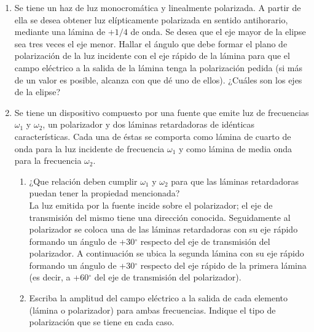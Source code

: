 \documentclass[11pt,spanish,a4paper]{article}
\begin{document}
\begin{enumerate}
\item Se tiene un haz de luz monocromática y linealmente polarizada. A partir
de ella se desea obtener luz elípticamente polarizada en sentido antihorario,
mediante una lámina de $+1/4$ de onda. Se desea que el eje mayor
de la elipse sea tres veces el eje menor. Hallar el ángulo que debe
formar el plano de polarización de la luz incidente con el eje rápido
de la lámina para que el campo eléctrico a la salida de la lámina
tenga la polarización pedida (si más de un valor es posible, alcanza
con que dé uno de ellos). ¿Cuáles son los ejes de la elipse?
\item Se tiene un dispositivo compuesto por una fuente que emite luz de
frecuencias $\omega_{1}$ y $\omega_{2}$, un polarizador y dos láminas
retardadoras de idénticas características. Cada una de éstas se comporta
como lámina de cuarto de onda para la luz incidente de frecuencia
$\omega_{1}$ y como lámina de media onda para la frecuencia $\omega_{2}$.
\begin{enumerate}
\item ¿Que relación deben cumplir $\omega_{1}$ y $\omega_{2}$ para que
las láminas retardadoras puedan tener la propiedad mencionada? \medskip{}
\\
La luz emitida por la fuente incide sobre el polarizador; el eje de
transmisión del mismo tiene una dirección conocida. Seguidamente al
polarizador se coloca una de las láminas retardadoras con su eje rápido
formando un ángulo de +30$^{\circ}$ respecto del eje de transmisión
del polarizador. A continuación se ubica la segunda lámina con su
eje rápido formando un ángulo de +30$^{\circ}$ respecto del eje rápido
de la primera lámina (es decir, a +60$^{\circ}$ del eje de transmisión
del polarizador).
\item Escriba la amplitud del campo eléctrico a la salida de cada elemento
(lámina o polarizador) para ambas frecuencias. Indique el tipo de
polarización que se tiene en cada caso. 
\end{enumerate}



\end{enumerate}
\end{document}
